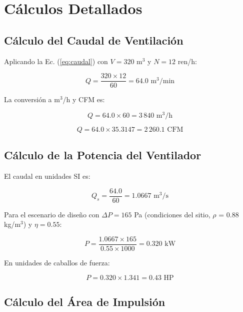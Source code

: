 \appendix
\section{Cálculos Detallados}
\label{appendix:calculations}

\subsection{Cálculo del Caudal de Ventilación}

Aplicando la Ec. (\ref{eq:caudal}) con $V = 320$ m$^3$ y $N = 12$ ren/h:

\begin{equation}
	Q = \frac{320 \times 12}{60} = 64.0 \text{ m}^3/\text{min}
\end{equation}

La conversión a m$^3$/h y CFM es:

\begin{equation}
	Q = 64.0 \times 60 = 3\,840 \text{ m}^3/\text{h}
\end{equation}

\begin{equation}
	Q = 64.0 \times 35.3147 = 2\,260.1 \text{ CFM}
\end{equation}

\subsection{Cálculo de la Potencia del Ventilador}

El caudal en unidades SI es:

\begin{equation}
	Q_s = \frac{64.0}{60} = 1.0667 \text{ m}^3/\text{s}
\end{equation}

Para el escenario de diseño con $\Delta P = 165$ Pa (condiciones del sitio, $\rho$ = 0.88 kg/m$^3$) y $\eta = 0.55$:

\begin{equation}
	P = \frac{1.0667 \times 165}{0.55 \times 1000} = 0.320 \text{ kW}
\end{equation}

En unidades de caballos de fuerza:

\begin{equation}
	P = 0.320 \times 1.341 = 0.43 \text{ HP}
\end{equation}

\subsection{Cálculo del Área de Impulsión}

